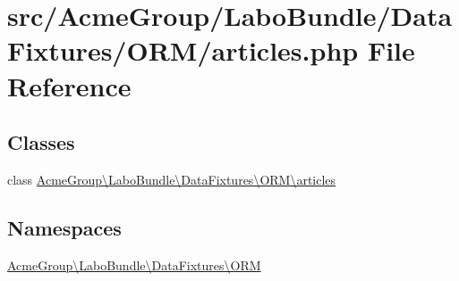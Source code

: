 \hypertarget{articles_8php}{\section{src/\+Acme\+Group/\+Labo\+Bundle/\+Data\+Fixtures/\+O\+R\+M/articles.php File Reference}
\label{articles_8php}
}
\subsection*{Classes}
\begin{DoxyCompactItemize}
\item 
class \hyperlink{class_acme_group_1_1_labo_bundle_1_1_data_fixtures_1_1_o_r_m_1_1articles}{Acme\+Group\textbackslash{}\+Labo\+Bundle\textbackslash{}\+Data\+Fixtures\textbackslash{}\+O\+R\+M\textbackslash{}articles}
\end{DoxyCompactItemize}
\subsection*{Namespaces}
\begin{DoxyCompactItemize}
\item 
 \hyperlink{namespace_acme_group_1_1_labo_bundle_1_1_data_fixtures_1_1_o_r_m}{Acme\+Group\textbackslash{}\+Labo\+Bundle\textbackslash{}\+Data\+Fixtures\textbackslash{}\+O\+R\+M}
\end{DoxyCompactItemize}
